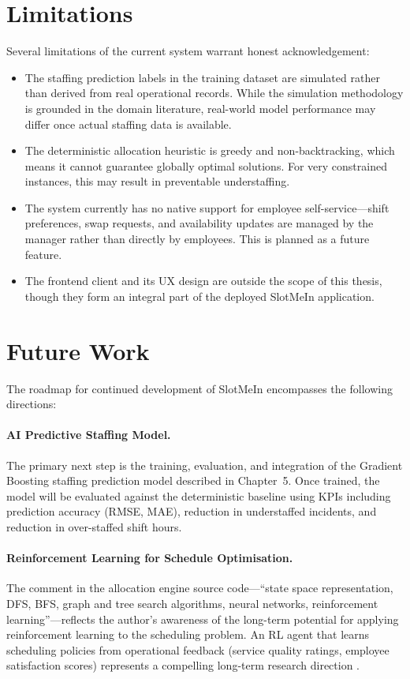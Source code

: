 \section{Limitations}

Several limitations of the current system warrant honest acknowledgement:

\begin{itemize}
    \item The staffing prediction labels in the training dataset are simulated rather than derived from real operational records. While the simulation methodology is grounded in the domain literature, real-world model performance may differ once actual staffing data is available.
    \item The deterministic allocation heuristic is greedy and non-backtracking, which means it cannot guarantee globally optimal solutions. For very constrained instances, this may result in preventable understaffing.
    \item The system currently has no native support for employee self-service—shift preferences, swap requests, and availability updates are managed by the manager rather than directly by employees. This is planned as a future feature.
    \item The frontend client and its UX design are outside the scope of this thesis, though they form an integral part of the deployed SlotMeIn application.
\end{itemize}

\section{Future Work}

The roadmap for continued development of SlotMeIn encompasses the following directions:

\paragraph{AI Predictive Staffing Model.} The primary next step is the training, evaluation, and integration of the Gradient Boosting staffing prediction model described in Chapter~5. Once trained, the model will be evaluated against the deterministic baseline using KPIs including prediction accuracy (RMSE, MAE), reduction in understaffed incidents, and reduction in over-staffed shift hours.

\paragraph{Reinforcement Learning for Schedule Optimisation.} The comment in the allocation engine source code—``state space representation, DFS, BFS, graph and tree search algorithms, neural networks, reinforcement learning''—reflects the author's awareness of the long-term potential for applying reinforcement learning to the scheduling problem. An RL agent that learns scheduling policies from operational feedback (service quality ratings, employee satisfaction scores) represents a compelling long-term research direction \cite{sutton_barto_2018}.

